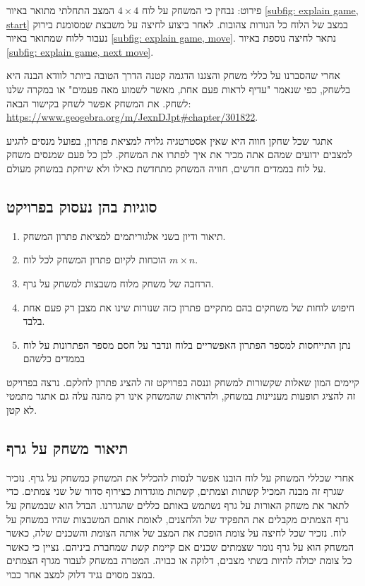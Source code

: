 \documentclass[12pt,leqno]{article}
\begin{document}
פירוט:
נבחין כי המשחק 
על לוח
$4 \times 4$
המצב התחלתי מתואר
באיור
\ref{subfig: explain game, start}
במצב של הלוח
כל הנורות צהובות.
לאחר ביצוע לחיצה על משבצת שמסומנת בירוק נעבור ללוח שמתואר באיור 
\ref{subfig: explain game, move}.
נתאר לחיצה נוספת באיור 
\ref{subfig: explain game, next move}.

אחרי שהסברנו על כללי משחק והצגנו הדגמה קטנה הדרך הטובה ביותר לוודא הבנה היא בלשחק,
כפי שנאמר "עדיף לראות פעם אחת, מאשר לשמוע מאה פעמים"
או במקרה שלנו לשחק.
את המשחק אפשר לשחק בקישור הבאה:
\url{https://www.geogebra.org/m/JexnDJpt#chapter/301822}.

אתגר שכל שחקן חווה היא 
שאין אסטרטגיה גלויה למציאת פתרון, בפועל מנסים להגיע למצבים ידועים
שמהם אתה מכיר את איך לפתרו את המשחק. 
לכן כל פעם שמנסים משחק על לוח בממדים חדשים, חוויה
המשחק מתחדשת כאילו ולא שיחקת במשחק מעולם.

\subsection{סוגיות בהן נעסוק בפרויקט}
\begin{enumerate}
	\item 
	תיאור ודיון בשני אלגוריתמים למציאת פתרון המשחק.
	\item 
	הוכחות לקיום פתרון המשחק לכל לוח
	$m\times n$.
	\item 
	הרחבה של משחק מלוח משבצות למשחק על גרף.
	\item 
    חיפוש לוחות של משחקים בהם מתקיים פתרון כזה שנורות שינו את מצבן רק פעם אחת בלבד.
    \item 
    נתן התייחסות למספר הפתרון האפשריים בלוח ונדבר על חסם מספר הפתרונות על לוח בממדים כלשהם
\end{enumerate}

קיימים המון שאלות שקשורות למשחק וננסה בפרויקט זה להציג פתרון לחלקם.
נרצה בפרויקט זה להציג תופעות מעניינות במשחק, ולהראות
שהמשחק אינו רק מהנה עלה גם אתגר מתמטי לא קטן.

\subsection{תיאור משחק על גרף}
אחרי שכללי המשחק על לוח הובנו אפשר לנסות להכליל את המשחק כמשחק על גרף.
נזכיר שגרף זה מבנה המכיל קשתות וצמתים, קשתות מוגדרות כצירוף סדור של שני צמתים.
כדי לתאר את משחק האורות על גרף נשתמש באותם כללים שהגדרנו.
הבדל הוא שבמשחק על גרף הצמתים מקבלים את התפקיד של הלחצנים, לאומת אותם המשבצות שהיו במשחק על לוח.
נזכיר שכל לחיצה על צומת הופכת את המצב של אותה הצומת והשכנים שלה,
כאשר המשחק הוא על גרף נומר שצמתים שכנים אם קיימת
קשת שמחברת ביניהם.
נציין כי כאשר כל צומת יכולה להיות בשתי מצבים,
דלוקה או כבויה.
המטרה במשחק לעבור מגרף הצמתים במצב מסוים נגיד דלוק למצב אחר כבוי.
\end{document}
